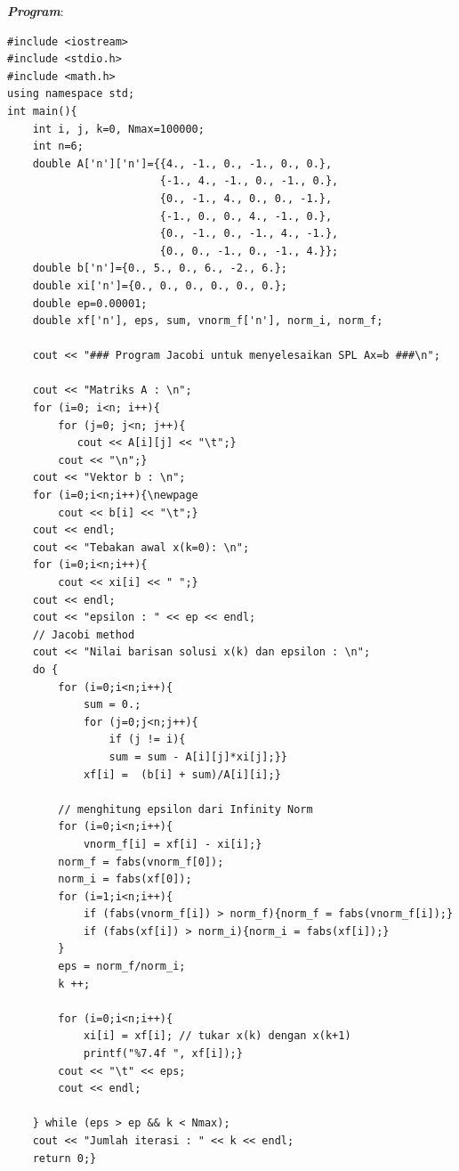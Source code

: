 \documentclass[paper=a4, fontsize=11pt]{scrartcl}
\numberwithin{equation}{section} %
\numberwithin{figure}{section} %
\numberwithin{table}{section} %
\begin{document}
\textit{\textbf{Program}}:
\begin{small}
\begin{verbatim}
#include <iostream>
#include <stdio.h>
#include <math.h>
using namespace std;
int main(){    
    int i, j, k=0, Nmax=100000;
    int n=6;
    double A['n']['n']={{4., -1., 0., -1., 0., 0.},
                        {-1., 4., -1., 0., -1., 0.},
                        {0., -1., 4., 0., 0., -1.},
                        {-1., 0., 0., 4., -1., 0.},
                        {0., -1., 0., -1., 4., -1.},
                        {0., 0., -1., 0., -1., 4.}};
    double b['n']={0., 5., 0., 6., -2., 6.};
    double xi['n']={0., 0., 0., 0., 0., 0.};
    double ep=0.00001;
    double xf['n'], eps, sum, vnorm_f['n'], norm_i, norm_f;

    cout << "### Program Jacobi untuk menyelesaikan SPL Ax=b ###\n";
    
    cout << "Matriks A : \n";
    for (i=0; i<n; i++){
        for (j=0; j<n; j++){ 
           cout << A[i][j] << "\t";}
        cout << "\n";}
    cout << "Vektor b : \n";
    for (i=0;i<n;i++){\newpage
        cout << b[i] << "\t";}
    cout << endl;
    cout << "Tebakan awal x(k=0): \n";
    for (i=0;i<n;i++){
        cout << xi[i] << " ";}
    cout << endl; 
    cout << "epsilon : " << ep << endl;
    // Jacobi method 
    cout << "Nilai barisan solusi x(k) dan epsilon : \n";
    do {
        for (i=0;i<n;i++){
            sum = 0.;
            for (j=0;j<n;j++){
                if (j != i){
                sum = sum - A[i][j]*xi[j];}}
            xf[i] =  (b[i] + sum)/A[i][i];}
        
        // menghitung epsilon dari Infinity Norm
        for (i=0;i<n;i++){
            vnorm_f[i] = xf[i] - xi[i];}
        norm_f = fabs(vnorm_f[0]);
        norm_i = fabs(xf[0]);
        for (i=1;i<n;i++){
            if (fabs(vnorm_f[i]) > norm_f){norm_f = fabs(vnorm_f[i]);}
            if (fabs(xf[i]) > norm_i){norm_i = fabs(xf[i]);}
        }
        eps = norm_f/norm_i;
        k ++;

        for (i=0;i<n;i++){
            xi[i] = xf[i]; // tukar x(k) dengan x(k+1)
            printf("%7.4f ", xf[i]);}
        cout << "\t" << eps;
        cout << endl;

    } while (eps > ep && k < Nmax);
    cout << "Jumlah iterasi : " << k << endl;
    return 0;}
\end{verbatim}
\end{small}
\end{document}
